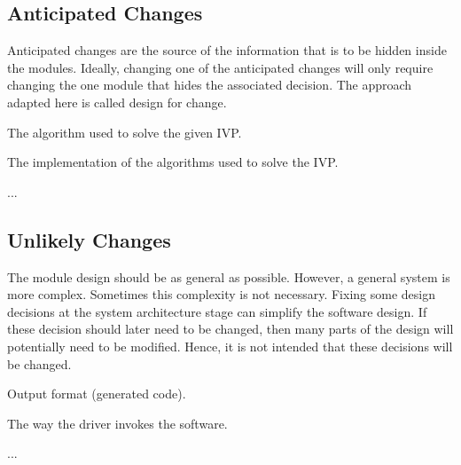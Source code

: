 \documentclass[12pt, titlepage]{article}
\newcounter{acnum}
\newcommand{\actheacnum}{AC\theacnum}
\newcounter{ucnum}
\newcommand{\uctheucnum}{UC\theucnum}
\begin{document}
\subsection{Anticipated Changes} \label{SecAchange}

Anticipated changes are the source of the information that is to be hidden
inside the modules. Ideally, changing one of the anticipated changes will only
require changing the one module that hides the associated decision. The approach
adapted here is called design for
change.

\begin{description}
\item[ \actheacnum \label{acAlgorithm}:] The algorithm 
used to solve the given IVP.
\item[ \actheacnum \label{acImplementation}:] The 
implementation of the algorithms used to solve the IVP.
\item ...
\end{description}

\subsection{Unlikely Changes} \label{SecUchange}

The module design should be as general as possible. However, a general system is
more complex. Sometimes this complexity is not necessary. Fixing some design
decisions at the system architecture stage can simplify the software design. If
these decision should later need to be changed, then many parts of the design
will potentially need to be modified. Hence, it is not intended that these
decisions will be changed.

\begin{description}
\item[ \uctheucnum \label{ucOutput}:] Output format 
(generated code).
\item[ \uctheucnum \label{ucInput}:] The way the driver 
invokes the software.
\item ...
\end{description}
\end{document}

